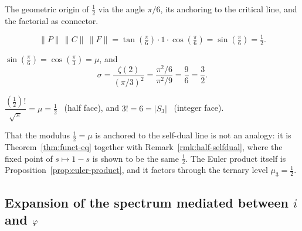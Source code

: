 The geometric origin of $\tfrac12$ via the angle $\pi/6$,
its anchoring to the critical line, and the factorial as connector.

\begin{theorem}\label{thm:collapse}
\begin{equation}\label{eq:collapse}
\|P\|\,\|C\|\,\|F\|
=\tan(\tfrac{\pi}{6})\cdot 1\cdot\cos(\tfrac{\pi}{6})
=\sin(\tfrac{\pi}{6})=\tfrac12 .
\end{equation}

\end{theorem}

\begin{proposition}\label{prop:angle}
$\sin(\tfrac{\pi}{6})=\cos(\tfrac{\pi}{3})=\mu$, and
\begin{equation}\label{eq:sigma-basel}
\sigma=\frac{\zeta(2)}{(\pi/3)^2}=\frac{\pi^2/6}{\pi^2/9}=\frac{9}{6}=\frac32 .
\end{equation}

\end{proposition}

\begin{proposition}\label{prop:connector}
$\dfrac{(\tfrac12)!}{\sqrt\pi}=\mu=\tfrac12$ \ (half face), and
$3!=6=|S_3|$ \ (integer face).

\end{proposition}

\begin{remark}\label{rmk:half-euler}
That the modulus $\tfrac12=\mu$ is anchored to the self-dual line is not an analogy: it is
Theorem~\ref{thm:funct-eq} together with Remark~\ref{rmk:half-selfdual}, where the fixed point of
$s\mapsto1-s$ is shown to be the same $\tfrac12$. The Euler product itself is
Proposition~\ref{prop:euler-product}, and it factors through the ternary level $\mu_3=\tfrac12$.
\end{remark}

\subsection{Expansion of the spectrum mediated between $i$ and $\varphi$}\label{ssec:spectrum}

